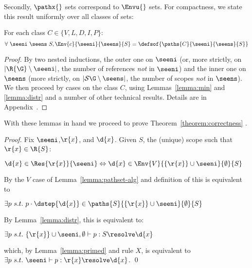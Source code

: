 \noindent
Secondly, $\pathx{}$ sets correspond to $\Envu{}$ sets. For compactness, we state this result
uniformly over all classes of sets:
\begin{lemma}
\label{lemma:pathset-alg}
For each class $C \in \{V,L,D,I,P\}$:\vspace*{-.3\baselineskip}
$$ \forall\ \seeni\ \seens\ S, \Env{c}{\seeni}{\seens}{S} = \defsof{\paths{C}{\seeni}{\seens}{S}}$$
\end{lemma}
\begin{proof}{By two nested inductions, 
the outer one on $\seeni$ (or, more strictly, on \mbox{$|\R{\G} \setminus \seeni|$}, the number of references
\emph{not} in $\seeni$) and the inner one on $\seens$ (more strictly, on \mbox{$|\S{\G} \setminus \seens|$}, the number of 
scopes \emph{not} in $\seens$).  We then proceed by cases on the class $C$, using
Lemmas~\ref{lemma:min} and \ref{lemma:distr} and a number of other technical results. 
Details are in Appendix~.}
\end{proof}

\noindent
With these lemmas in hand we proceed to prove Theorem~\ref{theorem:correctness} .
\begin{proof} Fix $\seeni$,$\r{x}$, and $\d{x}$. Given $S$, the (unique) scope such that $\r{x} \in \R{S}$:\smallskip\\
\centerline{$\d{x} \in \Res{\r{x}}{\seeni} \Leftrightarrow \d{x} \in \Env{V}{\{\r{x}\} \cup \seeni}{\emptyset}{S}$\smallskip}
By the $V$ case of Lemma~\ref{lemma:pathset-alg} and definition of  this is equivalent to\smallskip\\
\centerline{$\exists p\ s.t.\ p \cdot \dstep{\d{x}} \in \paths{S}{\{\r{x}\} \cup \seeni}{\emptyset}{S}$\smallskip}
By Lemma~\ref{lemma:distr}, this is equivalent to:\smallskip\\
\centerline{$\exists p\ s.t.\ \{\r{x}\} \cup \seeni,\emptyset \vdash p : S \resolve \d{x}$\smallskip}
which, by Lemma~\ref{lemma:primed} and rule $X$, is equivalent to $\exists p\ s.t.\ \seeni \vdash p : \r{x} \resolve \d{x}$. \qed 
\end{proof}



